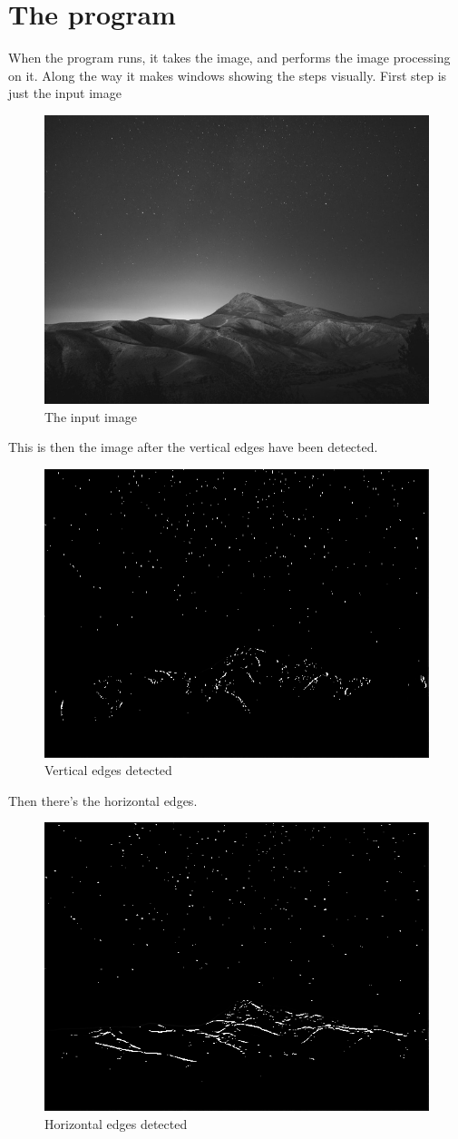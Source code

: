 \chapter{The program}
When the program runs, it takes the image, and performs the image processing on it. Along the way it makes windows showing the steps visually. First step is just the input image
	\begin{figure}[H]
		\centering
		\includegraphics[width=0.6\linewidth]{figure/grayScaleImage}
		\caption{The input image}
		\label{fig:grayScaleImage}
	\end{figure}
	This is then the image after the vertical edges have been detected.
	\begin{figure}[H]
		\centering
		\includegraphics[width=0.6\linewidth]{figure/xEdge}
		\caption{Vertical edges detected}
		\label{fig:xEdge}
	\end{figure}
	Then there's the horizontal edges.
	\begin{figure}[H]
		\centering
		\includegraphics[width=0.6\linewidth]{figure/yEdge}
		\caption{Horizontal edges detected}
		\label{fig:yEdge}
	\end{figure}
